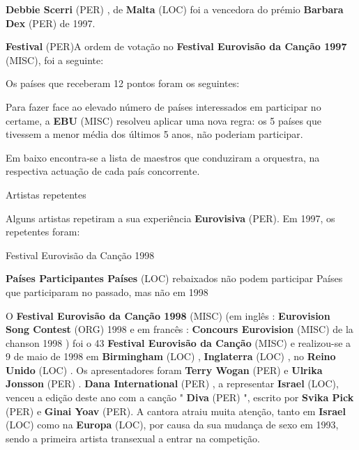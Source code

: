 \documentclass[12pt,a4paper]{article}
\begin{document}
\textbf{Debbie Scerri} (PER) , de \textbf{Malta} (LOC) foi a vencedora do prémio \textbf{Barbara Dex} (PER) de 1997.



\textbf{Festival} (PER)A ordem de votação no \textbf{Festival Eurovisão da Canção 1997} (MISC), foi a seguinte:

Os países que receberam 12 pontos foram os seguintes:

Para fazer face ao elevado número de países interessados em participar no certame, a \textbf{EBU} (MISC) resolveu aplicar uma nova regra: os 5 países que tivessem a menor média dos últimos 5 anos, não poderiam participar.

Em baixo encontra-se a lista de maestros que conduziram a orquestra, na respectiva actuação de cada país concorrente.



Artistas repetentes

Alguns artistas repetiram a sua experiência \textbf{Eurovisiva} (PER). Em 1997, os repetentes foram:



Festival Eurovisão da Canção 1998



\textbf{Países Participantes Países} (LOC) rebaixados não podem participar Países que participaram no passado, mas não em 1998

O \textbf{Festival Eurovisão da Canção 1998} (MISC) (em inglês : \textbf{Eurovision Song Contest} (ORG) 1998 e em francês : \textbf{Concours Eurovision} (MISC) de la chanson 1998 ) foi o 43 \textbf{Festival Eurovisão da Canção} (MISC) e realizou-se a 9 de maio de 1998 em \textbf{Birmingham} (LOC) , \textbf{Inglaterra} (LOC) , no \textbf{Reino Unido} (LOC) . Os apresentadores foram \textbf{Terry Wogan} (PER) e \textbf{Ulrika Jonsson} (PER) . \textbf{Dana International} (PER) , a representar \textbf{Israel} (LOC), venceu a edição deste ano com a canção " \textbf{Diva} (PER) ", escrito por \textbf{Svika Pick} (PER) e \textbf{Ginai Yoav} (PER). A cantora atraiu muita atenção, tanto em \textbf{Israel} (LOC) como na \textbf{Europa} (LOC), por causa da sua mudança de sexo em 1993, sendo a primeira artista transexual a entrar na competição.
\end{document}
